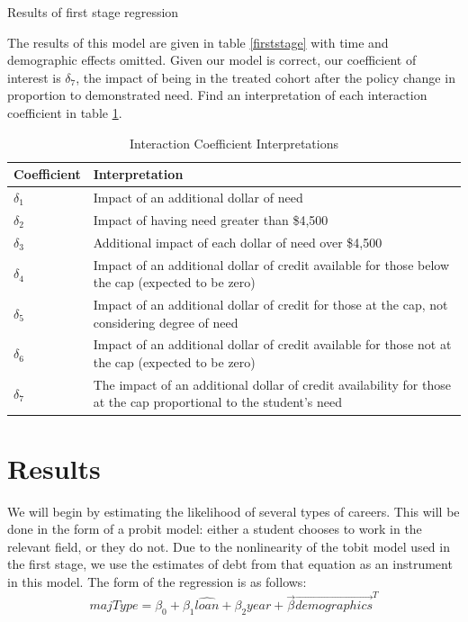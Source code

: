 \documentclass{article}
\newcommand{\regs}{../Analysis/Regressions/Output/}
\begin{document}
	 \begin{table}
	 	\centering
	 	\caption{Results of first stage regression}	 	
	 	
	 	\label{firststage}
	 \end{table}
	 
	 The results of this model are given in table \ref{firststage} with time and demographic effects omitted. Given our model is correct, our coefficient of interest is $\delta_7$, the impact of being in the treated cohort after the policy change in proportion to demonstrated need. Find an interpretation of each interaction coefficient in table \ref{coefInterp}.
	
	\begin{table}
		\centering
		\caption{Interaction Coefficient Interpretations}		
		\begin{tabular}{lp{8cm}}
			\toprule
			Coefficient & Interpretation\\
			\midrule
			$\delta_1$ & Impact of an additional dollar of need\\
			$\delta_2$ & Impact of having need greater than \$4,500 \\
			$\delta_3$ & Additional impact of each dollar of need over \$4,500 \\
			$\delta_4$ & Impact of an additional dollar of credit available for those below the cap (expected to be zero)\\
			$\delta_5$ & Impact of an additional dollar of credit for those at the cap, not considering degree of need\\
			$\delta_6$ & Impact of an additional dollar of credit available for those not at the cap (expected to be zero)\\
			$\delta_7$ & The impact of an additional dollar of credit availability for those at the cap proportional to the student's need \\
			\bottomrule
		\end{tabular}
	
		\label{coefInterp}
	\end{table}
	
	
	\section{Results}
	
	We will begin by estimating the likelihood of several types of careers. This will be done in the form of a probit model: either a student chooses to work in the relevant field, or they do not. Due to the nonlinearity of the tobit model used in the first stage, we use the estimates of debt from that equation as an instrument in this model. The form of the regression is as follows: $$majType = \beta_0 + \beta_1 \hat{loan} + \beta_2 year + \vec{\beta}\vec{demographics}^T$$
	
\end{document}
